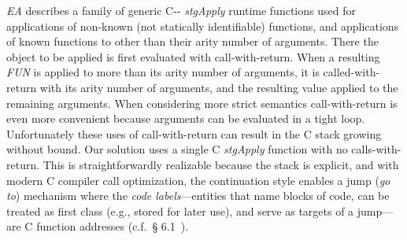 \documentclass{llncs}
\begin{document}
\emph{EA} describes a family of generic C-{}- \emph{stgApply} runtime
functions used for applications of non-known (not statically identifiable)
functions, and applications of known functions to other than their arity
number of arguments.  There the object to be applied is first evaluated with
call-with-return.  When a resulting \emph{FUN} is applied to more than its
arity number of arguments, it is called-with-return with its arity number of
arguments, and the resulting value applied to the remaining arguments.  When
considering more strict semantics call-with-return is even more convenient
because arguments can be evaluated in a tight loop.  Unfortunately these uses
of call-with-return can result in the C stack growing without bound.  Our
solution uses a single C \emph{stgApply} function with no calls-with-return.
This is straightforwardly realizable because the stack is explicit, and with
modern C compiler call optimization, the continuation style enables a jump
(\emph{go to}) mechanism where the \emph{code labels}---entities that name
blocks of code, can be treated as first class (e.g., stored for later use),
and serve as targets of a jump---are C function addresses (c.f.\ \S
6.1~\cite{PJ-stockhardware}).
\end{document}
